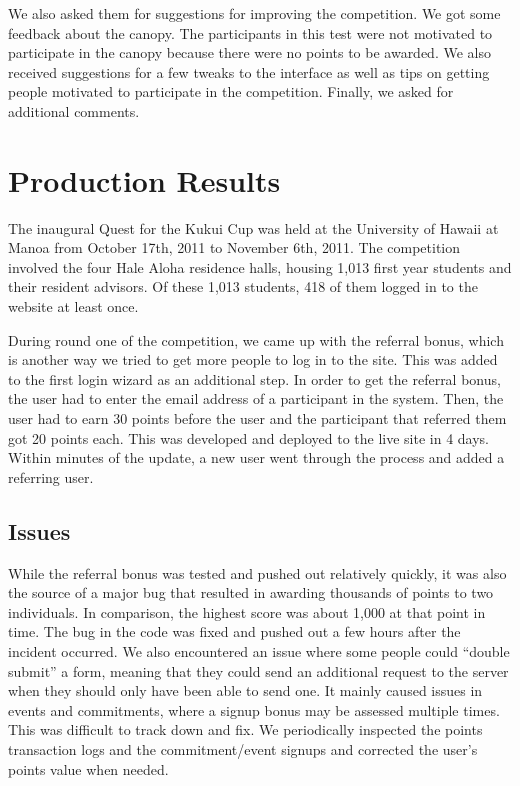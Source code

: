 We also asked them for suggestions for improving the competition. We got some feedback about the canopy. The participants in this test were not motivated to participate in the canopy because there were no points to be awarded. We also received suggestions for a few tweaks to the interface as well as tips on getting people motivated to participate in the competition. Finally, we asked for additional comments.

\section{Production Results}

The inaugural Quest for the Kukui Cup was held at the University of Hawaii at Manoa from October 17th, 2011 to November 6th, 2011. The competition involved the four Hale Aloha residence halls, housing 1,013 first year students and their resident advisors. Of these 1,013 students, 418 of them logged in to the website at least once.

During round one of the competition, we came up with the referral bonus, which is another way we tried to get more people to log in to the site. This was added to the first login wizard as an additional step. In order to get the referral bonus, the user had to enter the email address of a participant in the system. Then, the user had to earn 30 points before the user and the participant that referred them got 20 points each. This was developed and deployed to the live site in 4 days. Within minutes of the update, a new user went through the process and added a referring user.

\subsection{Issues}
While the referral bonus was tested and pushed out relatively quickly, it was also the source of a major bug that resulted in awarding thousands of points to two individuals. In comparison, the highest score was about 1,000 at that point in time. The bug in the code was fixed and pushed out a few hours after the incident occurred. We also encountered an issue where some people could ``double submit'' a form, meaning that they could send an additional request to the server when they should only have been able to send one. It mainly caused issues in events and commitments, where a signup bonus may be assessed multiple times. This was difficult to track down and fix. We periodically inspected the points transaction logs and the commitment/event signups and corrected the user's points value when needed.

